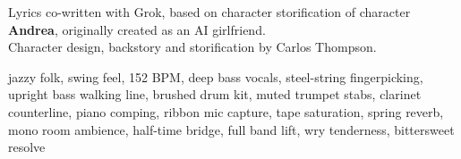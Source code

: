 

\begin{notes}
Lyrics co-written with Grok, based on character storification of character \textbf{Andrea}, originally created as an AI girlfriend.\newline\\
Character design, backstory and storification by Carlos Thompson.
\end{notes}

\begin{style}
jazzy folk, swing feel, 152 BPM, deep bass vocals, steel-string fingerpicking, upright bass walking line, brushed drum kit, muted trumpet stabs, clarinet counterline, piano comping, ribbon mic capture, tape saturation, spring reverb, mono room ambience, half-time bridge, full band lift, wry tenderness, bittersweet resolve
\end{style}

